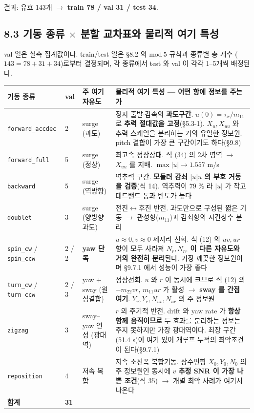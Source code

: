 \documentclass[10pt,a4paper]{article}
\begin{document}
결과: 유효 143개 $\to$ \textbf{train 78 / val 31 / test 34}.

\subsection*{8.3 기동 종류 $\times$ 분할 교차표와 물리적 여기 특성}

val 열은 실측 집계값이다. train/test 열은 \S{}8.2 의 $\mathrm{mod}\ 5$ 규칙과 종류별 총 개수 ($143 = 78 + 31 + 34$)로부터 결정되며, 각 종류에서 test 와 val 이 각각 1--5개씩 배정된다.

\begin{center}\footnotesize\setlength{\tabcolsep}{3pt}
\begin{tabular}{@{}lllp{8.26cm}@{}}
\toprule
\textbf{기동 종류} & \textbf{val} & \textbf{주 여기 자유도} & \textbf{물리적 여기 특성 --- 어떤 항에 정보를 주는가} \\
\midrule
\texttt{forward\_accdec} & 2 & surge (과도) & 정지 출발$\cdot$감속의 \textbf{과도구간}. $\dot u(0) = \tau_x/m_{11}$ 로 \textbf{추력 절대값을 고정}(\S{}5.3-1). $X_u, X_{uu}$ 와 추력 스케일을 분리하는 거의 유일한 정보원. pitch 결합이 가장 큰 구간이기도 하다(\S{}9.8) \\
\texttt{forward\_full} & 5 & surge (정상) & 최고속 정상상태. 식 (34) 의 2차 영역 $\to$ $X_{uu}$ 를 지배. $\max|u| \to 1.557$ m/s \\
\texttt{backward} & 5 & surge (역방향) & 역추력 구간. \textbf{모듈러 감쇠 $|u|u$ 의 부호 거동을 검증}(식 14). 역추력이 79 \% 라 $|u|$ 가 작고 데드밴드 통과 빈도가 높다 \\
\texttt{doublet} & 3 & surge (양방향 과도) & 전진$\leftrightarrow$후진 반전. 과도만으로 구성된 짧은 기동 $\to$ 관성항($m_{11}$)과 감쇠항의 시간상수 분리 \\
\texttt{spin\_cw} / \texttt{spin\_ccw} & 2 / 2 & \textbf{yaw 단독} & $u \approx 0, v \approx 0$ 제자리 선회. 식 (12) 의 $uv, ur$ 항이 모두 사라져 \textbf{$N_r, N_{rr}$ 이 다른 자유도와 거의 완전히 분리}된다. 가장 깨끗한 정보원이며 \S{}9.7.1 에서 성능이 가장 좋다 \\
\texttt{turn\_cw} / \texttt{turn\_ccw} & 2 / 3 & yaw + sway (원심결합) & 정상선회. $u$ 와 $r$ 이 동시에 크므로 식 (12) 의 $-m_{22}vr$, $m_{11}ur$ 가 활성 $\to$ \textbf{sway 를 간접 여기}. $Y_v, Y_r, N_{uv}, N_{ur}$ 의 주 정보원 \\
\texttt{zigzag} & 3 & sway--yaw 연성 (광대역) & $r$ 의 주기적 반전. drift 와 yaw rate 가 \textbf{항상 함께 움직이므로} 두 효과를 분리하는 정보는 주지 못하지만 가장 광대역이다. 최장 구간(51.4 s)이 여기 있어 개루프 누적의 최악조건이 된다(\S{}9.7.1) \\
\texttt{reposition} & 4 & 저속 복합 & 저속 소진폭 복합기동. 상수편향 $X_0, Y_0, N_0$ 의 주 정보원인 동시에 \textbf{$v$ 추정 SNR 이 가장 나쁜 조건}(식 35) $\to$ 개별 최악 사례가 여기서 나온다 \\
\textbf{합계} & \textbf{31} &  &  \\
\bottomrule
\end{tabular}
\end{center}
\end{document}
